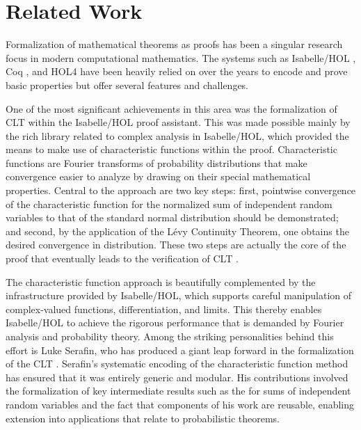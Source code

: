 \section{Related Work}

Formalization of mathematical theorems as proofs has been a singular research focus in modern computational mathematics. The systems such as Isabelle/HOL \citep{isabelle}, Coq \citep{bertot2013interactive}, and HOL4 \citep{slind2008brief} have been heavily relied on over the years to encode and prove basic properties but offer several features and challenges.

One of the most significant achievements in this area was the formalization of CLT within the Isabelle/HOL proof assistant. This was made possible mainly by the rich library related to complex analysis in Isabelle/HOL, which provided the means to make use of characteristic functions within the proof. Characteristic functions are Fourier transforms of probability distributions that make convergence easier to analyze by drawing on their special mathematical properties. Central to the approach are two key steps: first, pointwise convergence of the characteristic function for the normalized sum of independent random variables to that of the standard normal distribution should be demonstrated; and second, by the application of the L\'evy Continuity Theorem, one obtains the desired convergence in distribution. These two steps are actually the core of the proof that eventually leads to the verification of CLT \cite{billingsley2017probability}.

The characteristic function approach is beautifully complemented by the infrastructure provided by Isabelle/HOL, which supports careful manipulation of complex-valued functions, differentiation, and limits. This thereby enables Isabelle/HOL to achieve the rigorous performance that is demanded by Fourier analysis and probability theory. Among the striking personalities behind this effort is Luke Serafin, who has produced a giant leap forward in the formalization of the CLT \cite{serafin2015formally}. Serafin's systematic encoding of the characteristic function method has ensured that it was entirely generic and modular. His contributions involved the formalization of key intermediate results such as the for sums of independent random variables and the fact that components of his work are reusable, enabling extension into applications that relate to probabilistic theorems.

